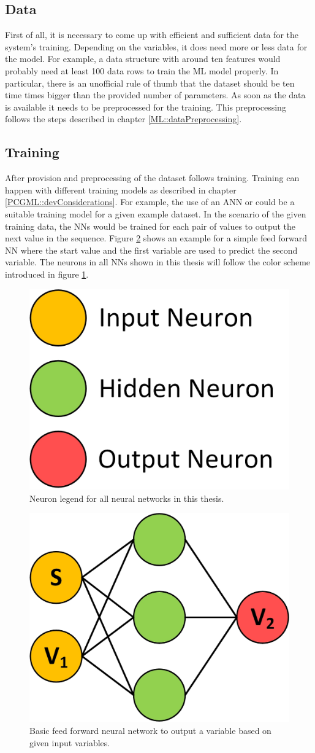 \documentclass[MGS,Master,english]{twbook}%
\begin{document}
\subsection{Data}
First of all, it is necessary to come up with efficient and sufficient data for the system’s training. Depending on the variables, it does need more or less data for the model. For example, a data structure with around ten features would probably need at least 100 data rows to train the ML model properly. In particular, there is an unofficial rule of thumb that the dataset should be ten time times bigger than the provided number of parameters. As soon as the data is available it needs to be preprocessed for the training. This preprocessing follows the steps described in chapter \ref{ML::dataPreprocessing}.


\subsection{Training}
After provision and preprocessing of the dataset follows training. Training can happen with different training models as described in chapter \ref{PCGML::devConsiderations}. For example, the use of an ANN or could be a suitable training model for a given example dataset. In the scenario of the given training data, the \acp{NN} would be trained for each pair of values to output the next value in the sequence. Figure \ref{fig::PCGML::devExample::NNbasic} shows an example for a simple feed forward \ac{NN} where the start value and the first variable are used to predict the second variable. The neurons in all \acp{NN} shown in this thesis will follow the color scheme introduced in figure \ref{fig::neuron_legend}. 
\begin{figure}[!htbp]
	\centering
	\includegraphics[width=0.25\linewidth]{PICs/NNs/neurons_legend.jpg}
	\caption{Neuron legend for all neural networks in this thesis.}\label{fig::neuron_legend}
\end{figure}
\begin{figure}[!htbp]
	\centering
	\includegraphics[width=0.3\linewidth]{PICs/NNs/PCGML_development_example_NN_basic}
	\caption{Basic feed forward neural network to output a variable based on given input variables.}\label{fig::PCGML::devExample::NNbasic}
\end{figure}
\end{document}
